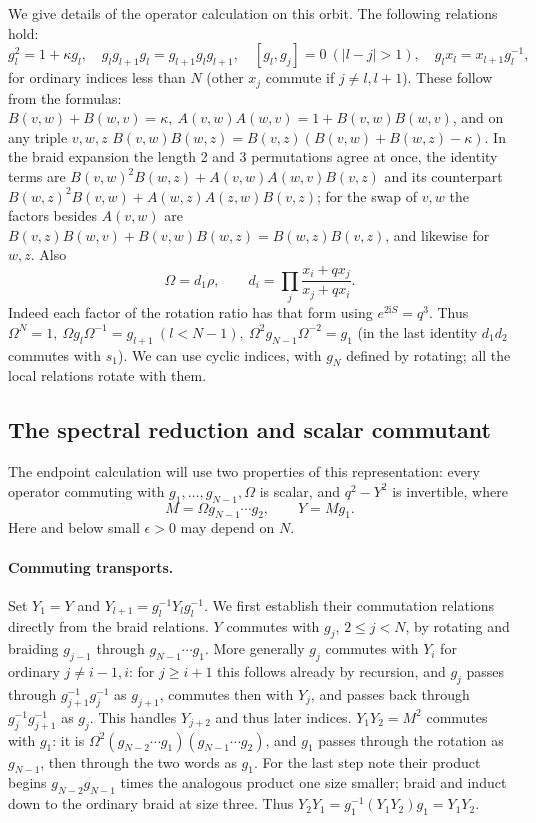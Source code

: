 We give details of the operator calculation on this orbit. The following relations hold:
\begin{equation}
 g_l^2=1+\kappa g_l,\quad g_l g_{l+1}g_l=g_{l+1}g_lg_{l+1},\quad
 [g_l,g_j]=0\ (|l-j|>1),\quad g_l x_l=x_{l+1}g_l^{-1},
                                                                    \label{c2:eq-6}
\end{equation}
for ordinary indices less than \(N\) (other \(x_j\) commute if \(j\ne l,l+1\)). These follow from the formulas: \(B(v,w)+B(w,v)=\kappa,\ A(v,w)A(w,v)=1+B(v,w)B(w,v)\), and on any triple \(v,w,z\)
\(B(v,w)B(w,z)=B(v,z)(B(v,w)+B(w,z)-\kappa)\). In the braid expansion the length 2 and 3 permutations agree at once, the identity terms are \(B(v,w)^2B(w,z)+A(v,w)A(w,v)B(v,z)\) and its counterpart \(B(w,z)^2B(v,w)+A(w,z)A(z,w)B(v,z)\); for the swap of \(v,w\) the factors besides \(A(v,w)\) are \(B(v,z)B(w,v)+B(v,w)B(w,z)=B(w,z)B(v,z)\), and likewise for \(w,z\). Also
\[
 \Omega=d_1\rho,\qquad d_i=\prod_j\frac{x_i+q x_j}{x_j+q x_i}.
\]
Indeed each factor of the rotation ratio has that form using \(e^{2\mathrm i S}=q^3\). Thus \(\Omega^N=1,\ \Omega g_l\Omega^{-1}=g_{l+1}\ (l<N-1),\ \Omega^2g_{N-1}\Omega^{-2}=g_1\) (in the last identity \(d_1 d_2\) commutes with \(s_1\)). We can use cyclic indices, with \(g_N\) defined by rotating; all the local relations rotate with them.

\subsection{The spectral reduction and scalar commutant}

The endpoint calculation will use two properties of this representation:
every operator commuting with $g_1,\ldots,g_{N-1},\Omega$ is scalar,
and $q^2-Y^2$ is invertible, where
\[
 M=\Omega g_{N-1}\cdots g_2,\qquad Y=Mg_1.
\]
Here and below small \(\epsilon>0\) may depend on \(N\).

\paragraph{Commuting transports.}
Set $Y_1=Y$ and $Y_{l+1}=g_l^{-1}Y_lg_l^{-1}$.  We first establish
their commutation relations directly from the braid relations. \(Y\) commutes with \(g_j\), \(2\le j<N\), by rotating and braiding \(g_{j-1}\) through \(g_{N-1}\cdots g_1\). More generally \(g_j\) commutes with \(Y_i\) for ordinary \(j\ne i-1,i\): for \(j\ge i+1\) this follows already by recursion, and \(g_j\) passes through \(g_{j+1}^{-1}g_j^{-1}\) as \(g_{j+1}\), commutes then with \(Y_j\), and passes back through \(g_j^{-1}g_{j+1}^{-1}\) as \(g_j\). This handles \(Y_{j+2}\) and thus later indices. \(Y_1Y_2=M^2\) commutes with \(g_1\): it is \(\Omega^2 (g_{N-2}\cdots g_1)(g_{N-1}\cdots g_2)\), and \(g_1\) passes through the rotation as \(g_{N-1}\), then through the two words as \(g_1\). For the last step note their product begins \(g_{N-2}g_{N-1}\) times the analogous product one size smaller; braid and induct down to the ordinary braid at size three. Thus $Y_2Y_1=g_1^{-1}(Y_1Y_2)g_1=Y_1Y_2$.

